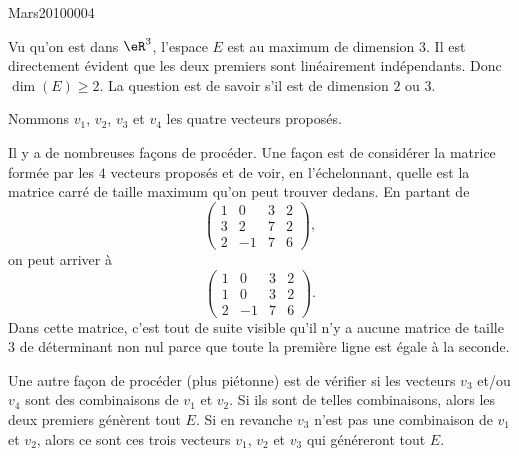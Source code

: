 

\begin{corrige}{Mars20100004}

	Vu qu'on est dans $\eR^3$, l'espace $E$ est au maximum de dimension $3$. Il est
    directement évident que les deux premiers sont linéairement indépendants. Donc
    $\dim(E)\geq 2$. La question est de savoir s'il est de dimension $2$ ou $3$.

	Nommons $v_1$, $v_2$, $v_3$ et $v_4$ les quatre vecteurs proposés.

	Il y a de nombreuses façons de procéder. Une façon est de considérer la matrice formée par les $4$ vecteurs proposés et de voir, en l'échelonnant, quelle est la matrice carré de taille maximum qu'on peut trouver dedans. En partant de
	\begin{equation}
		\begin{pmatrix}
			 1	&	0	&	3	&	2	\\
			 3	&	2	&	7	&	2	\\ 
			 2	&	-1	&	7	&	6
		 \end{pmatrix},
	\end{equation}
	on peut arriver à
	\begin{equation}
		\begin{pmatrix}
			 1	&	0	&	3	&	2	\\
			 1	&	0	&	3	&	2	\\ 
			 2	&	-1	&	7	&	6
		 \end{pmatrix}.
	\end{equation}
	Dans cette matrice, c'est tout de suite visible qu'il n'y a aucune matrice de taille $3$ de déterminant non nul parce que toute la première ligne est égale à la seconde.

	Une autre façon de procéder (plus piétonne) est de vérifier si les vecteurs $v_3$ et/ou $v_4$ sont des combinaisons de $v_1$ et $v_2$. Si ils sont de telles combinaisons, alors les deux premiers génèrent tout $E$.  Si en revanche $v_3$ n'est pas une combinaison de $v_1$ et $v_2$, alors ce sont ces trois vecteurs $v_1$, $v_2$ et $v_3$ qui généreront tout $E$.


\end{corrige}
